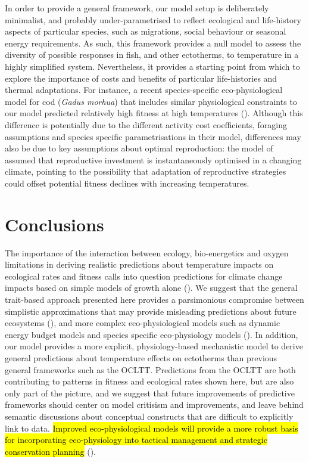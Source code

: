 \documentclass[11pt]{article}\usepackage[]{graphicx}\usepackage[]{color,soul}
\begin{document}
In order to provide a general framework, our model setup is deliberately minimalist, and probably under-parametrised to reflect ecological and life-history aspects of particular species, such as migrations, social behaviour or seasonal energy requirements. As such, this framework provides a null model to assess the diversity of possible responses in fish, and other ectotherms, to temperature in a highly simplified system. Nevertheless, it provides a starting point from which to explore the importance of costs and benefits of particular life-histories and thermal adaptations. For instance, a recent species-specific eco-physiological model for cod (\emph{Gadus morhua}) that includes similar physiological constraints to our model predicted relatively high fitness at high temperatures (\citealt{holt_climate_2014,holt_climate_2015}). Although this difference is potentially due to the different activity cost coefficients, foraging assumptions and species specific parametrisations in their model, differences may also be due to key assumptions about optimal reproduction: the model of  \citet{holt_climate_2014} assumed that reproductive investment is instantaneously optimised in a changing climate, pointing to the possibility that adaptation of reproductive strategies could offset potential fitness declines with increasing temperatures.

\section*{Conclusions}

The importance of the interaction between ecology, bio-energetics and oxygen limitations in deriving realistic predictions about temperature impacts on ecological rates and fitness calls into question predictions for climate change impacts based on simple models of growth alone (\citealt{cheung_shrinking_2013, pauly_sound_2017}). We suggest that the general trait-based approach presented here provides a parsimonious compromise between simplistic approximations that may provide misleading predictions about future ecosystems (\citealt{brander_overconfidence_2013, lefevre_models_2017}), and more complex eco-physiological models such as dynamic energy budget models \cite[e.g., ][]{guiet_effects_2016} and species specific eco-physiology models (\citealt{hufnagl_physiological_2011, holt_climate_2014,holt_climate_2015}). In addition, our model provides a more explicit, physiology-based mechanistic model to derive general predictions about temperature effects on ectotherms than previous general frameworks such as the OCLTT. Predictions from the OCLTT are both contributing to patterns in fitness and ecological rates shown here, but are also only part of the picture, and we suggest that future improvements of predictive frameworks should center on model critisism and improvements, and leave behind semantic discussions about conceptual constructs that are difficult to explicitly link to data. \hl{Improved eco-physiological models will provide a more robust basis for incorporating eco-physiology into tactical management and strategic conservation planning} (\citealt{mckenzieconservation2016, pattersonperspective2016}).
\end{document}
